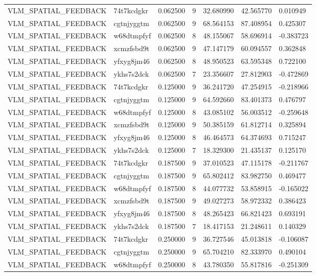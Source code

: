 \begin{tabular}{lllllll}
VLM\_SPATIAL\_FEEDBACK & 74t7kcdgkr & 0.062500 & 9 & 32.680990 & 42.565770 & 0.010949 \\
VLM\_SPATIAL\_FEEDBACK & cgtnjyggtm & 0.062500 & 9 & 68.564153 & 87.408954 & 0.425307 \\
VLM\_SPATIAL\_FEEDBACK & w68dtmpfyf & 0.062500 & 8 & 48.155067 & 58.696914 & -0.383723 \\
VLM\_SPATIAL\_FEEDBACK & xcmzfsbd9t & 0.062500 & 9 & 47.147179 & 60.094557 & 0.362848 \\
VLM\_SPATIAL\_FEEDBACK & yfxyg8jm46 & 0.062500 & 8 & 48.950523 & 63.595348 & 0.722100 \\
VLM\_SPATIAL\_FEEDBACK & ykhs7s2dck & 0.062500 & 7 & 23.356607 & 27.812903 & -0.472869 \\
VLM\_SPATIAL\_FEEDBACK & 74t7kcdgkr & 0.125000 & 9 & 36.241720 & 47.254915 & -0.218966 \\
VLM\_SPATIAL\_FEEDBACK & cgtnjyggtm & 0.125000 & 9 & 64.592660 & 83.401373 & 0.476797 \\
VLM\_SPATIAL\_FEEDBACK & w68dtmpfyf & 0.125000 & 8 & 43.085102 & 56.003512 & -0.259648 \\
VLM\_SPATIAL\_FEEDBACK & xcmzfsbd9t & 0.125000 & 9 & 50.385159 & 61.812714 & 0.325894 \\
VLM\_SPATIAL\_FEEDBACK & yfxyg8jm46 & 0.125000 & 8 & 46.464573 & 64.374693 & 0.715247 \\
VLM\_SPATIAL\_FEEDBACK & ykhs7s2dck & 0.125000 & 7 & 18.329300 & 21.435137 & 0.125170 \\
VLM\_SPATIAL\_FEEDBACK & 74t7kcdgkr & 0.187500 & 9 & 37.010523 & 47.115178 & -0.211767 \\
VLM\_SPATIAL\_FEEDBACK & cgtnjyggtm & 0.187500 & 9 & 65.802412 & 83.982750 & 0.469477 \\
VLM\_SPATIAL\_FEEDBACK & w68dtmpfyf & 0.187500 & 8 & 44.077732 & 53.858915 & -0.165022 \\
VLM\_SPATIAL\_FEEDBACK & xcmzfsbd9t & 0.187500 & 9 & 49.027273 & 58.972332 & 0.386423 \\
VLM\_SPATIAL\_FEEDBACK & yfxyg8jm46 & 0.187500 & 8 & 48.265423 & 66.821423 & 0.693191 \\
VLM\_SPATIAL\_FEEDBACK & ykhs7s2dck & 0.187500 & 7 & 18.417153 & 21.248611 & 0.140329 \\
VLM\_SPATIAL\_FEEDBACK & 74t7kcdgkr & 0.250000 & 9 & 36.727546 & 45.013818 & -0.106087 \\
VLM\_SPATIAL\_FEEDBACK & cgtnjyggtm & 0.250000 & 9 & 65.704210 & 82.333970 & 0.490104 \\
VLM\_SPATIAL\_FEEDBACK & w68dtmpfyf & 0.250000 & 8 & 43.780350 & 55.817816 & -0.251309 \\

\end{tabular}
